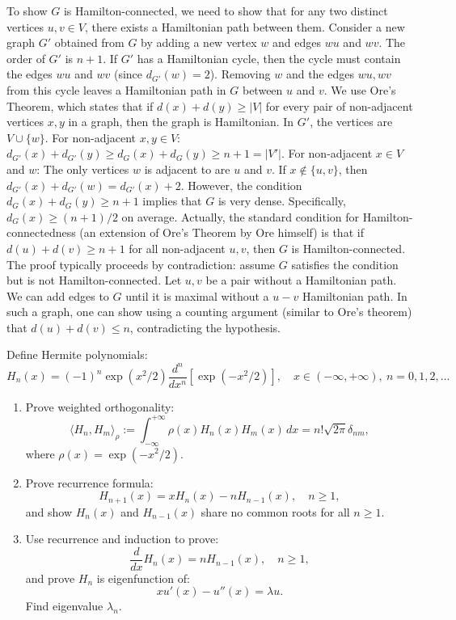 \begin{solution}
To show $G$ is Hamilton-connected, we need to show that for any two distinct vertices $u, v \in V$, there exists a Hamiltonian path between them.
Consider a new graph $G'$ obtained from $G$ by adding a new vertex $w$ and edges $wu$ and $wv$. The order of $G'$ is $n+1$.
If $G'$ has a Hamiltonian cycle, then the cycle must contain the edges $wu$ and $wv$ (since $d_{G'}(w)=2$). Removing $w$ and the edges $wu, wv$ from this cycle leaves a Hamiltonian path in $G$ between $u$ and $v$.
We use Ore's Theorem, which states that if $d(x) + d(y) \geq |V|$ for every pair of non-adjacent vertices $x, y$ in a graph, then the graph is Hamiltonian.
In $G'$, the vertices are $V \cup \{w\}$. For non-adjacent $x, y \in V$:
$d_{G'}(x) + d_{G'}(y) \geq d_G(x) + d_G(y) \geq n+1 = |V'|$.
For non-adjacent $x \in V$ and $w$:
The only vertices $w$ is adjacent to are $u$ and $v$. If $x \notin \{u, v\}$, then $d_{G'}(x) + d_{G'}(w) = d_{G'}(x) + 2$.
However, the condition $d_G(x) + d_G(y) \geq n+1$ implies that $G$ is very dense. Specifically, $d_G(x) \geq (n+1)/2$ on average.
Actually, the standard condition for Hamilton-connectedness (an extension of Ore's Theorem by Ore himself) is that if $d(u) + d(v) \geq n+1$ for all non-adjacent $u, v$, then $G$ is Hamilton-connected.
The proof typically proceeds by contradiction: assume $G$ satisfies the condition but is not Hamilton-connected. Let $u, v$ be a pair without a Hamiltonian path. We can add edges to $G$ until it is maximal without a $u-v$ Hamiltonian path. In such a graph, one can show using a counting argument (similar to Ore's theorem) that $d(u) + d(v) \leq n$, contradicting the hypothesis.
\end{solution}

\begin{exercise}
\label{applied:2018:4}
Define Hermite polynomials:
\[
H_{n}(x)=(-1)^{n}\exp(x^{2}/2)\frac{d^{n}}{dx^{n}}[\exp(-x^{2}/2)],\quad x\in(-\infty,+\infty),\ n=0,1,2,\dots
\]

\begin{enumerate}
\item[(a)] Prove weighted orthogonality:
\[
\langle H_{n},H_{m}\rangle_{\rho}:=\int_{-\infty}^{+\infty}\rho(x)H_{n}(x)H_{m}(x)\,dx=n!\sqrt{2\pi}\delta_{nm},
\]
where $\rho(x)=\exp(-x^{2}/2)$.
\item[(b)] Prove recurrence formula:
\[
H_{n+1}(x)=xH_{n}(x)-nH_{n-1}(x),\quad n\geq 1,
\]
and show $H_{n}(x)$ and $H_{n-1}(x)$ share no common roots for all $n\geq 1$.
\item[(c)] Use recurrence and induction to prove:
\[
\frac{d}{dx}H_{n}(x)=nH_{n-1}(x),\quad n\geq 1,
\]
and prove $H_{n}$ is eigenfunction of:
\[
xu'(x)-u''(x)=\lambda u.
\]
Find eigenvalue $\lambda_{n}$.
\end{enumerate}
\end{exercise}

